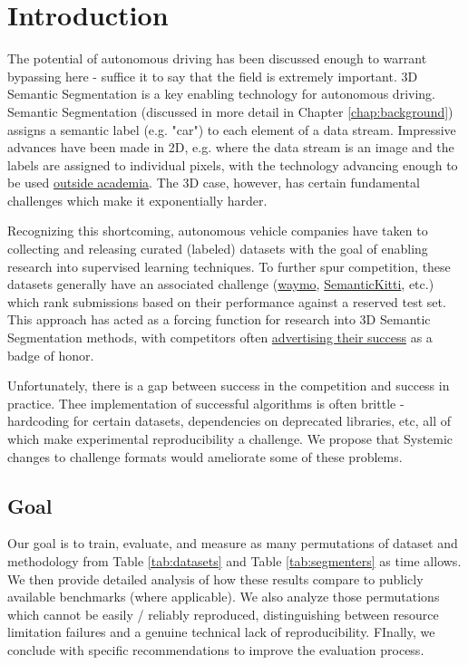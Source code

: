 \section{Introduction}
\label{chap:introduction}

The potential of autonomous driving has been discussed enough to warrant bypassing here - suffice it to say that the field is extremely important. 3D Semantic Segmentation is a key enabling technology for autonomous driving. Semantic Segmentation (discussed in more detail in Chapter \ref{chap:background}) assigns a semantic label (e.g. "car") to each element of a data stream. Impressive advances have been made in 2D, e.g. where the data stream is an image and the labels are assigned to individual pixels, with the technology advancing enough to be used \href{https://nanonets.com/blog/semantic-image-segmentation-2020/}{outside academia}. The 3D case, however, has certain fundamental challenges which make it exponentially harder.

Recognizing this shortcoming, autonomous vehicle companies have taken to collecting and releasing curated (labeled) datasets with the goal of enabling research into supervised learning techniques. To further spur competition, these datasets generally have an associated challenge (\href{https://waymo.com/open/challenges/}{waymo}, \href{https://codalab.lisn.upsaclay.fr/competitions/6280}{SemanticKitti}, etc.) which rank submissions based on their performance against a reserved test set. This approach has acted as a forcing function for research into 3D Semantic Segmentation methods, with competitors often \href{https://github.com/xinge008/Cylinder3D}{advertising their success} as a badge of honor.

Unfortunately, there is a gap between success in the competition and success in practice. Thee implementation of successful algorithms is often brittle - hardcoding for certain datasets, dependencies on deprecated libraries, etc, all of which make experimental reproducibility a challenge. We propose that Systemic changes to challenge formats would ameliorate some of these problems.

\subsection{Goal}
\label{sec:goal}

Our goal is to train, evaluate, and measure as many permutations of dataset and methodology from Table \ref{tab:datasets} and Table \ref{tab:segmenters} as time allows. We then provide detailed analysis of how these results compare to publicly available benchmarks (where applicable). We also analyze those permutations which cannot be easily / reliably reproduced, distinguishing between resource limitation failures and a genuine technical lack of reproducibility. FInally, we conclude with specific recommendations to improve the evaluation process.

